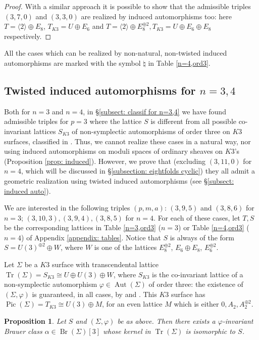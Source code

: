 \documentclass{amsart}
\newtheorem{prop}[theorem]{Proposition}
\theoremstyle{definition}
\DeclareMathOperator{\aut}{Aut}
\DeclareMathOperator{\pic}{Pic}
\DeclareMathOperator{\br}{Br}
\DeclareMathOperator{\trans}{Tr}
\begin{document}
\begin{proof}
With a similar approach it is possible to show that the admissible triples $(3,7,0)$ and $(3,3,0)$ are realized by induced automorphisms too: here $T = \langle 2 \rangle \oplus E_8$, \mbox{$T_{K3} = U \oplus E_6$} and $T = \langle 2 \rangle \oplus E_8^{\oplus 2}, T_{K3} = U \oplus E_6 \oplus E_8$ respectively. 
\end{proof}

All the cases which can be realized by non-natural, non-twisted induced automorphisms are marked with the symbol $\natural$ in Table \ref{n=4,ord3}.

\subsection{Twisted induced automorphisms for $n=3,4$}
Both for $n=3$ and $n=4$, in \S \ref{subsect: classif for n=3,4} we have found  admissible triples for $p=3$ where the lattice $S$ is different from all possible co-invariant lattices $S_{K3}$ of non-symplectic automorphisms of order three on $K3$ surfaces, classified in \cite{autom_k3_ord3}. Thus, we cannot realize these cases in a natural way, nor using induced automorphisms on moduli spaces of ordinary sheaves on $K3$'s (Proposition \ref{prop: induced}). However, we prove that (excluding $(3,11,0)$ for $n=4$, which will be discussed in \S \ref{subsection: eightfolds cyclic}) they all admit a geometric realization using twisted induced automorphisms (see \S \ref{subsect: induced auto}).

We are interested in the following triples $(p,m,a)$: $(3,9,5)$ and $(3,8,6)$ for \mbox{$n=3$}; $(3,10,3), (3,9,4), (3,8,5)$ for $n=4$. For each of these cases, let $T,S$ be the corresponding lattices in Table \ref{n=3,ord3} ($n=3$) or Table \ref{n=4,ord3} ($n=4$) of Appendix \ref{appendix: tables}. Notice that $S$ is always of the form $S = U(3)^{\oplus 2} \oplus W$, where $W$ is one of the lattices $E_8^{\oplus 2}$, $E_6 \oplus E_8$, $E_6^{\oplus 2}$.

Let $\Sigma$ be a $K3$ surface with transcendental lattice $\trans(\Sigma) = S_{K3} \cong U \oplus U(3) \oplus W$, where $S_{K3}$ is the co-invariant lattice of a non-symplectic automorphism $\varphi \in \aut(\Sigma)$ of order three: the existence of $(\Sigma, \varphi)$ is guaranteed, in all cases, by \cite[Theorem 3.3]{autom_k3_ord3} and \cite[Table 2]{autom_k3_ord3}. This $K3$ surface has $\pic(\Sigma) = T_{K3} \cong U(3) \oplus M$, for an even lattice $M$ which is either $0, A_2, A_2^{\oplus 2}$.

\begin{prop} \label{prop: choice of brauer class}
Let $S$ and $(\Sigma, \varphi)$ be as above. Then there exists a $\varphi$-invariant Brauer class $\alpha \in \br(\Sigma)[3]$ whose kernel in $\trans(\Sigma)$ is isomorphic to $S$.
\end{prop}
 
\end{document}
